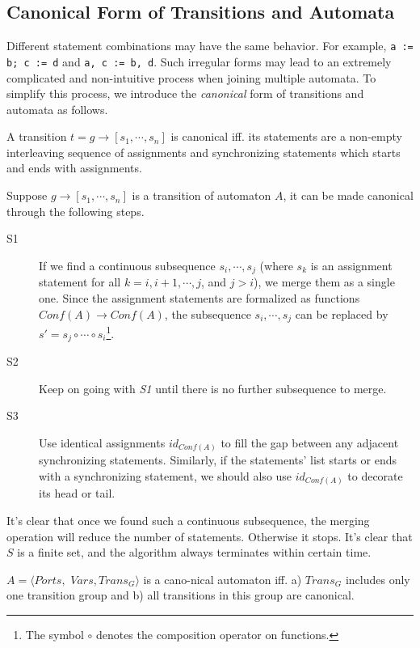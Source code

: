 \subsection{Canonical Form of Transitions and Automata}
\label{subsec:canonical}

Different statement combinations may have the same behavior. For example, \texttt{a := b; c := d} and \texttt{a, c := b, d}. Such irregular forms may lead to an extremely complicated and non-intuitive process when joining multiple automata. 
To simplify this process, we introduce the \emph{canonical} form of transitions and automata as follows.

\begin{definition}
A transition $t=g\rightarrow[s_1,\cdots,s_n]$ is canonical iff. its statements are a non-empty interleaving sequence of assignments and synchronizing statements which starts and ends with assignments.
\end{definition}

Suppose $g\rightarrow[s_1,\cdots,s_n]$ is a transition of automaton $A$, it can be made canonical through the following steps.
\begin{description}
    \item[S1] If we find a continuous subsequence $s_i,\cdots,s_j$ (where $s_k$ is an assignment statement for all $k= i,i+1,\cdots,j$, and $j>i$), we merge them as a single one. Since the assignment statements are formalized as functions $Conf(A)\rightarrow Conf(A)$, the subsequence $s_i,\cdots, s_j$ can be replaced by $s'=s_j\circ\cdots \circ s_i$\footnote{The symbol $\circ$ denotes the composition operator on functions.}.
    \item[S2] Keep on going with \emph{S1} until there is no further subsequence to merge.
    \item[S3] Use identical assignments $id_{Conf(A)}$ to fill the gap between any adjacent synchronizing statements. Similarly, if the statements' list starts or ends with a synchronizing statement, we should also use $id_{Conf(A)}$ to decorate its head or tail.
\end{description}

It's clear that once we found such a continuous subsequence, the merging operation will reduce the number of statements. Otherwise it stops. It's clear that $S$ is a finite set, and the algorithm always terminates within certain time.

\begin{definition}
    $A=\langle Ports,$ $Vars,Trans_G\rangle$ is a cano-nical automaton iff. a) $Trans_G$ includes only one transition group and b) all transitions in this group are canonical.
\end{definition}

